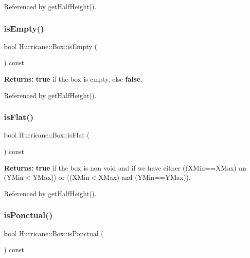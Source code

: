 Referenced by get\+Half\+Height().

\mbox{\label{classHurricane_1_1Box_af8b269603b5c173891a484214ca50266}} 
\subsubsection{\texorpdfstring{is\+Empty()}{isEmpty()}}
{\footnotesize\ttfamily bool Hurricane\+::\+Box\+::is\+Empty (\begin{DoxyParamCaption}{ }\end{DoxyParamCaption}) const}

{\bfseries Returns\+:} {\bfseries true} if the box is empty, else {\bfseries false}. 

Referenced by get\+Half\+Height().

\mbox{\label{classHurricane_1_1Box_a0df4d580a3dc1eb23d839c0f53cdee8b}} 
\subsubsection{\texorpdfstring{is\+Flat()}{isFlat()}}
{\footnotesize\ttfamily bool Hurricane\+::\+Box\+::is\+Flat (\begin{DoxyParamCaption}{ }\end{DoxyParamCaption}) const}

{\bfseries Returns\+:} {\bfseries true} if the box is non void and if we have either ((X\+Min==X\+Max) an (Y\+Min$<$Y\+Max)) or ((X\+Min$<$X\+Max) and (Y\+Min==Y\+Max)). 

Referenced by get\+Half\+Height().

\mbox{\label{classHurricane_1_1Box_a3d073c5bc3d0ea1b4f21937e36be001f}} 
\subsubsection{\texorpdfstring{is\+Ponctual()}{isPonctual()}}
{\footnotesize\ttfamily bool Hurricane\+::\+Box\+::is\+Ponctual (\begin{DoxyParamCaption}{ }\end{DoxyParamCaption}) const}

